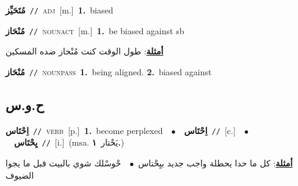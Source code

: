 \documentclass[10pt,a4paper,twoside]{article} %
\begin{document}
\begin{multicols}{2}
{\setlength\topsep{0pt}\textbf{\foreignlanguage{arabic}{مُتَحَيِّز}}\ {\color{gray}\texttt{//}\color{black}}\ \textsc{adj}\ [m.]\ \textbf{1.}~biased\ } \vspace{2mm}

{\setlength\topsep{0pt}\textbf{\foreignlanguage{arabic}{مُنْحَاز}}\ {\color{gray}\texttt{//}\color{black}}\ \textsc{noun\textunderscore act}\ [m.]\ \textbf{1.}~be biased against sb\  \begin{flushright}\color{gray}\foreignlanguage{arabic}{\textbf{\underline{\foreignlanguage{arabic}{أمثلة}}}: طول الوقت كنت مُنْحاز ضده المسكين}\end{flushright}\color{black}} \vspace{2mm}

{\setlength\topsep{0pt}\textbf{\foreignlanguage{arabic}{مُنْحَاز}}\ {\color{gray}\texttt{//}\color{black}}\ \textsc{noun\textunderscore pass}\ \textbf{1.}~being aligned.  \textbf{2.}~biased against\ } \vspace{2mm}

\vspace{-3mm}
\subsection*{\color{blue}\foreignlanguage{arabic}{ح.و.س}\color{blue}{}} 

{\setlength\topsep{0pt}\textbf{\foreignlanguage{arabic}{اِحْتَاس}}\ {\color{gray}\texttt{//}\color{black}}\ \textsc{verb}\ [p.]\ \textbf{1.}~become perplexed\ \ $\bullet$\ \ \setlength\topsep{0pt}\textbf{\foreignlanguage{arabic}{اِحْتَاس}}\ {\color{gray}\texttt{//}\color{black}}\ [c.]\ \ $\bullet$\ \ \setlength\topsep{0pt}\textbf{\foreignlanguage{arabic}{يِحْتَاس}}\ {\color{gray}\texttt{//}\color{black}}\ [i.]\ \color{gray}(msa. \foreignlanguage{arabic}{يَحْتار}~\foreignlanguage{arabic}{\textbf{١.}})\color{black}\  \begin{flushright}\color{gray}\foreignlanguage{arabic}{\textbf{\underline{\foreignlanguage{arabic}{أمثلة}}}: كل ما حدا يحطلة واجب جديد بيِحْتاس\ $\bullet$\ \  حْوسْلك شوي بالبيت قبل ما يجوا الضيوف}\end{flushright}\color{black}} \vspace{2mm}


\end{multicols}
\end{document}
